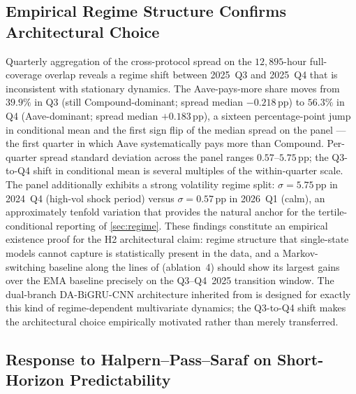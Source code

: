 \subsection{Empirical Regime Structure Confirms Architectural Choice}
\label{sec:regime-empirical}

Quarterly aggregation of the cross-protocol spread on the
$12{,}895$-hour full-coverage overlap reveals a regime shift between
2025~Q3 and 2025~Q4 that is inconsistent with stationary dynamics.
The Aave-pays-more share moves from $39.9\%$ in Q3 (still
Compound-dominant; spread median $-0.218$\,pp) to $56.3\%$ in Q4
(Aave-dominant; spread median $+0.183$\,pp), a sixteen
percentage-point jump in conditional mean and the first sign flip of
the median spread on the panel --- the first quarter in which Aave
systematically pays more than Compound. Per-quarter spread standard
deviation across the panel ranges $0.57$--$5.75$\,pp; the Q3-to-Q4
shift in conditional mean is several multiples of the within-quarter
scale. The panel additionally exhibits a strong volatility regime
split: $\sigma=5.75$\,pp in 2024~Q4 (high-vol shock period) versus
$\sigma=0.57$\,pp in 2026~Q1 (calm), an approximately tenfold
variation that provides the natural anchor for the
tertile-conditional reporting of \cref{sec:regime}. These findings
constitute an empirical existence proof for the H2 architectural
claim: regime structure that single-state models cannot capture is
statistically present in the data, and a Markov-switching baseline
along the lines of \cite{hamilton1989regimeswitching} (ablation~4)
should show its largest gains over the EMA baseline precisely on the
Q3--Q4~2025 transition window. The dual-branch DA-BiGRU-CNN
architecture inherited from \cite{solovev2026lob} is designed for
exactly this kind of regime-dependent multivariate dynamics; the
Q3-to-Q4 shift makes the architectural choice empirically motivated
rather than merely transferred.

\subsection{Response to Halpern--Pass--Saraf on Short-Horizon Predictability}
\label{sec:fair-rates-response}

